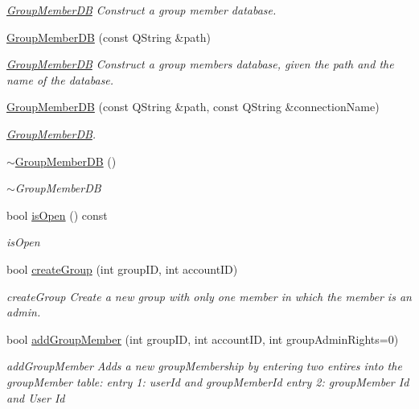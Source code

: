 \begin{DoxyCompactItemize}
\begin{DoxyCompactList}\small\item\em \hyperlink{classGroupMemberDB}{Group\+Member\+DB} Construct a group member database. \end{DoxyCompactList}\item 
\hyperlink{classGroupMemberDB_a16cbd098d20e4ef4e848eb32ada8285c}{Group\+Member\+DB} (const Q\+String \&path)
\begin{DoxyCompactList}\small\item\em \hyperlink{classGroupMemberDB}{Group\+Member\+DB} Construct a group members database, given the path and the name of the database. \end{DoxyCompactList}\item 
\hyperlink{classGroupMemberDB_a0b0f153543aea1c695904b480f32ae11}{Group\+Member\+DB} (const Q\+String \&path, const Q\+String \&connection\+Name)
\begin{DoxyCompactList}\small\item\em \hyperlink{classGroupMemberDB}{Group\+Member\+DB}. \end{DoxyCompactList}\item 
\hyperlink{classGroupMemberDB_a10069210b5ed6856d20fb68192e28c52}{$\sim$\+Group\+Member\+DB} ()
\begin{DoxyCompactList}\small\item\em $\sim$\+Group\+Member\+DB \end{DoxyCompactList}\item 
bool \hyperlink{classGroupMemberDB_a1ae935d7a185d05e0f2eec85ec88e4bb}{is\+Open} () const 
\begin{DoxyCompactList}\small\item\em is\+Open \end{DoxyCompactList}\item 
bool \hyperlink{classGroupMemberDB_a23e976a5f1a2f7163c8c81cb5369e45f}{create\+Group} (int group\+ID, int account\+ID)
\begin{DoxyCompactList}\small\item\em create\+Group Create a new group with only one member in which the member is an admin. \end{DoxyCompactList}\item 
bool \hyperlink{classGroupMemberDB_a2027f8341b63928fd65f2791b18aa5a8}{add\+Group\+Member} (int group\+ID, int account\+ID, int group\+Admin\+Rights=0)
\begin{DoxyCompactList}\small\item\em add\+Group\+Member Adds a new group\+Membership by entering two entires into the group\+Member table\+: entry 1\+: user\+Id and group\+Member\+Id entry 2\+: group\+Member Id and User Id \end{DoxyCompactList}\item 

\end{DoxyCompactItemize}
